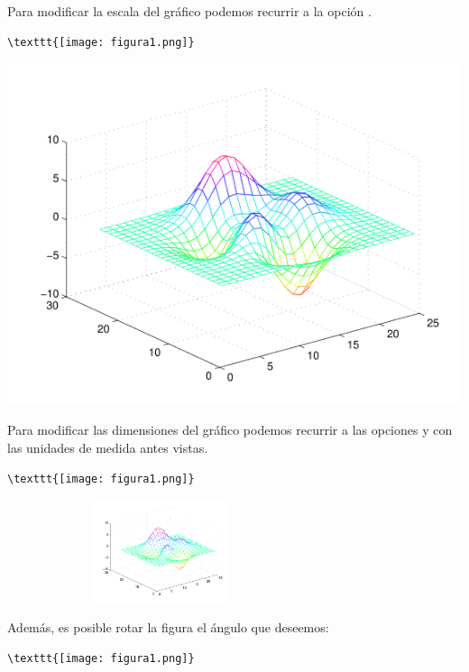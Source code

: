 \documentclass[a4,10pt]{aleph-notas}
\begin{document}
Para modificar la escala del gráfico podemos recurrir a la opción \verb@scale@.

\begin{lstlisting}[frame=single]
\texttt{[image: figura1.png]}
\end{lstlisting}

\begin{center}
    \includegraphics[scale=0.5]{Imagenes/figura1.png}
\end{center}

Para modificar las dimensiones del gráfico podemos recurrir a las opciones \verb@height@ y \verb@width@ con las unidades de medida antes vistas.

\begin{lstlisting}[frame=single]
\texttt{[image: figura1.png]}
\end{lstlisting}

\begin{center}
    \includegraphics[height=3cm,width=9cm]{Imagenes/figura1.png}
\end{center}

Además, es posible rotar la figura el ángulo que deseemos:

\begin{lstlisting}[frame=single]
\texttt{[image: figura1.png]}
\end{lstlisting}
\end{document}
